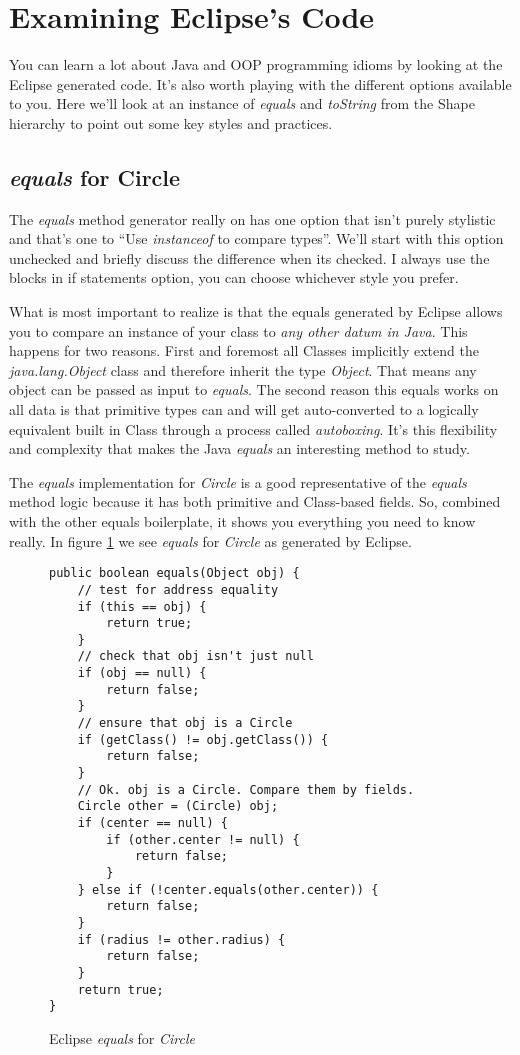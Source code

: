 \documentclass[nobib]{tufte-handout}
\begin{document}
\section{Examining Eclipse's Code}

You can learn a lot about Java and OOP programming idioms by looking at the Eclipse generated code. It's also worth playing with the different options available to you. Here we'll look at an instance of \textit{equals} and \textit{toString} from the Shape hierarchy to point out some key styles and practices.

\subsection{\textit{equals} for Circle}

The \textit{equals} method generator really on has one option that isn't purely stylistic and that's one to ``Use \textit{instanceof} to compare types''. We'll start with this option unchecked and briefly discuss the difference when its checked. I always use the blocks in if statements option, you can choose whichever style you prefer.

What is most important to realize is that the equals generated by Eclipse allows you to compare an instance of your class to \textit{any other datum in Java}. This happens for two reasons. First and foremost all Classes implicitly extend the \textit{java.lang.Object} class and therefore inherit the type \textit{Object}. That means any object can be passed as input to \textit{equals}. The second reason this equals works on all data is that primitive types can and will get auto-converted to a logically equivalent built in Class through a process called \textit{autoboxing}. It's this flexibility and complexity that makes the Java \textit{equals} an interesting method to study.

The \textit{equals} implementation for \textit{Circle} is a good representative of the \textit{equals} method logic because it has both primitive and Class-based fields. So, combined with the other equals boilerplate, it shows you
everything you need to know really. In figure \ref{fig:circeq} we see \textit{equals} for \textit{Circle} as generated by Eclipse.

\begin{figure}
\begin{lstlisting}
public boolean equals(Object obj) {
    // test for address equality
	if (this == obj) {
		return true;
	}
	// check that obj isn't just null
	if (obj == null) {
		return false;
	}
	// ensure that obj is a Circle
	if (getClass() != obj.getClass()) {
		return false;
	}
	// Ok. obj is a Circle. Compare them by fields.
	Circle other = (Circle) obj;
	if (center == null) {
		if (other.center != null) {
			return false;
		}
	} else if (!center.equals(other.center)) {
		return false;
	}
	if (radius != other.radius) {
		return false;
	}
	return true;
}
\end{lstlisting}
\label{fig:circeq}
\caption{Eclipse \textit{equals} for \textit{Circle}}
\end{figure}
\end{document}
